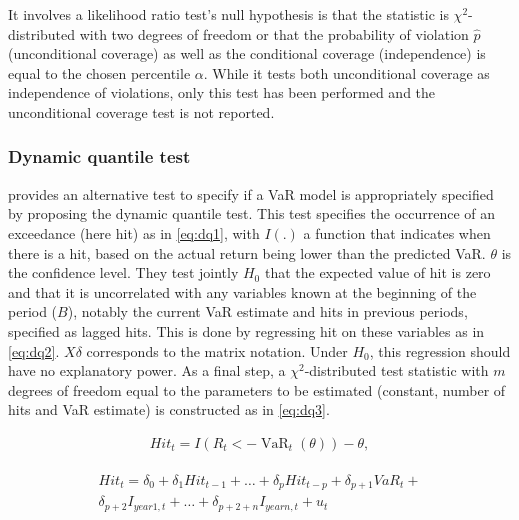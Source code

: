 \documentclass[a4paper, nobind]{templates/ociamthesis}
\begin{document}
\noindent It involves a likelihood ratio test's null hypothesis is that the statistic is \(\chi^2\)-distributed with two degrees of freedom or that the probability of violation \(\hat p\) (unconditional coverage) as well as the conditional coverage (independence) is equal to the chosen percentile \(\alpha\). While it tests both unconditional coverage as independence of violations, only this test has been performed and the unconditional coverage test is not reported.

\hypertarget{dynamic-quantile-test}{%
\subsubsection{Dynamic quantile test}\label{dynamic-quantile-test}}

\noindent \textcite{engle2004} provides an alternative test to specify if a VaR model is appropriately specified by proposing the dynamic quantile test. This test specifies the occurrence of an exceedance (here hit) as in \eqref{eq:dq1}, with \(I(.)\) a function that indicates when there is a hit, based on the actual return being lower than the predicted VaR. \(\theta\) is the confidence level. They test jointly \(H_0\) that the expected value of hit is zero and that it is uncorrelated with any variables known at the beginning of the period (\(B\)), notably the current VaR estimate and hits in previous periods, specified as lagged hits. This is done by regressing hit on these variables as in \eqref{eq:dq2}. \(X\delta\) corresponds to the matrix notation. Under \(H_0\), this regression should have no explanatory power. As a final step, a \(\chi^2\)-distributed test statistic with \(m\) degrees of freedom equal to the parameters to be estimated (constant, number of hits and VaR estimate) is constructed as in \eqref{eq:dq3}.

\begin{align}
Hit_{t}=I\left(R_{t}<-\operatorname{VaR}_{t}(\theta)\right)-\theta,
\label{eq:dq1}
\end{align}

\begin{align}
\begin{array}{c}
Hit_{t}=\delta_{0}+\delta_{1} H i t_{t-1}+\ldots+\delta_{p} Hit_{t-p}+\delta_{p+1} VaR_{t}+ \\
\delta_{p+2} I_{year1, t}+\ldots+\delta_{p+2+n} I_{year n, t}+u_{t} \end{array}
\label{eq:dq2}
\end{align}
\end{document}
